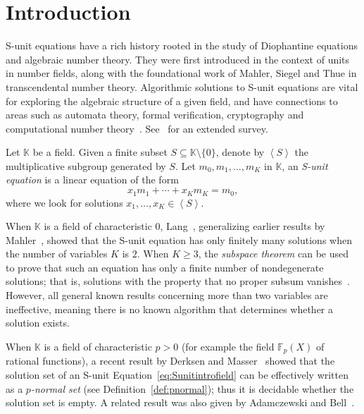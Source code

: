 \documentclass[letterpaper, 11pt, thm-restate]{article}
\numberwithin{equation}{section}
\newcommand{\K}{\mathbb{K}}
\newcommand{\F}{\mathbb{F}}
\newcommand{\gen}[1]{\left\langle {#1} \right\rangle}
\theoremstyle{definition}
\theoremstyle{definition}
\theoremstyle{definition}
\begin{document}

\newpage
\setcounter{page}{1}

\section{Introduction}
S-unit equations have a rich history rooted in the study of Diophantine equations and algebraic number theory. They were first introduced in the context of units in number fields, along with the foundational work of Mahler, Siegel and Thue in transcendental number theory. 
Algorithmic solutions to S-unit equations are vital for exploring the algebraic structure of a given field, and have connections to areas such as automata theory, formal verification, cryptography and computational number theory~\cite{10.5555/1481045, adamczewski2012vanishing, 10.1007/978-3-030-80914-0_1, lipton2022skolem, benedikt2023complexity}.
See~\cite{Evertse1988} for an extended survey.

Let $\K$ be a field.
Given a finite subset $S \subseteq \K \setminus \{0\}$, denote by $\gen{S}$ the multiplicative subgroup generated by $S$.
Let $m_0, m_1, \ldots, m_K$ in $\K$, an \emph{S-unit equation} is a linear equation of the form
\begin{equation}\label{eq:Sunitintrofield}
    x_1 m_1 + \cdots + x_K m_K = m_0,
\end{equation}
where we look for solutions $x_1, \ldots, x_K \in \gen{S}$.

When $\K$ is a field of characteristic $0$, Lang~\cite{Lang1960}, generalizing earlier results by Mahler~\cite{Mahler1932}, showed that the S-unit equation has only finitely many solutions when the number of variables $K$ is $2$.
When $K \geq 3$, the \emph{subspace
theorem} can be used to prove that such an equation has only a finite number of nondegenerate solutions; that is, solutions with the property that no proper subsum vanishes~\cite{Evertse1984,PoortenSchlickewei1991}.
However, all general known results concerning more than two variables are ineffective, meaning there is no known algorithm that determines whether a solution exists.

When $\K$ is a field of characteristic $p > 0$ (for example the field $\F_p(X)$ of rational functions), a recent result by Derksen and Masser~\cite{derksen2012linear} showed that the solution set of an S-unit Equation~\eqref{eq:Sunitintrofield} can be effectively written as a \emph{$p$-normal set} (see Definition~\ref{def:pnormal}); thus it is decidable whether the solution set is empty.
A related result was also given by Adamczewski and Bell~\cite{adamczewski2012vanishing}.
\end{document}
